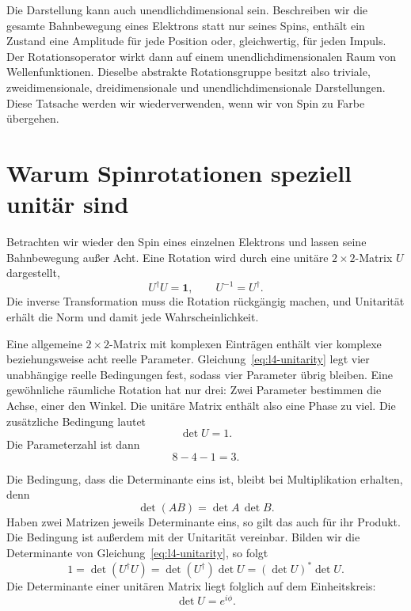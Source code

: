 Die Darstellung kann auch unendlichdimensional sein. Beschreiben wir die gesamte Bahnbewegung eines Elektrons statt nur seines Spins, enthält ein Zustand eine Amplitude für jede Position oder, gleichwertig, für jeden Impuls. Der Rotationsoperator wirkt dann auf einem unendlichdimensionalen Raum von Wellenfunktionen. Dieselbe abstrakte Rotationsgruppe besitzt also triviale, zweidimensionale, dreidimensionale und unendlichdimensionale Darstellungen. Diese Tatsache werden wir wiederverwenden, wenn wir von Spin zu Farbe übergehen.

\section{Warum Spinrotationen speziell unitär sind}

Betrachten wir wieder den Spin eines einzelnen Elektrons und lassen seine Bahnbewegung außer Acht. Eine Rotation wird durch eine unitäre \(2\times2\)-Matrix \(U\) dargestellt,
\begin{equation}
U^\dagger U=\boldsymbol 1,
\qquad
U^{-1}=U^\dagger.
\label{eq:l4-unitarity}
\end{equation}
Die inverse Transformation muss die Rotation rückgängig machen, und Unitarität erhält die Norm und damit jede Wahrscheinlichkeit.

Eine allgemeine \(2\times2\)-Matrix mit komplexen Einträgen enthält vier komplexe beziehungsweise acht reelle Parameter. Gleichung~\eqref{eq:l4-unitarity} legt vier unabhängige reelle Bedingungen fest, sodass vier Parameter übrig bleiben. Eine gewöhnliche räumliche Rotation hat nur drei: Zwei Parameter bestimmen die Achse, einer den Winkel. Die unitäre Matrix enthält also eine Phase zu viel. Die zusätzliche Bedingung lautet
\begin{equation}
\det U=1.
\label{eq:l4-det-one}
\end{equation}
Die Parameterzahl ist dann
\begin{equation}
8-4-1=3.
\end{equation}

Die Bedingung, dass die Determinante eins ist, bleibt bei Multiplikation erhalten, denn
\begin{equation}
\det(AB)=\det A\,\det B.
\end{equation}
Haben zwei Matrizen jeweils Determinante eins, so gilt das auch für ihr Produkt. Die Bedingung ist außerdem mit der Unitarität vereinbar. Bilden wir die Determinante von Gleichung~\eqref{eq:l4-unitarity}, so folgt
\begin{equation}
1=\det(U^\dagger U)
=\det(U^\dagger)\det U
=(\det U)^*\det U.
\end{equation}
Die Determinante einer unitären Matrix liegt folglich auf dem Einheitskreis:
\begin{equation}
\det U=e^{i\phi}.
\end{equation}

